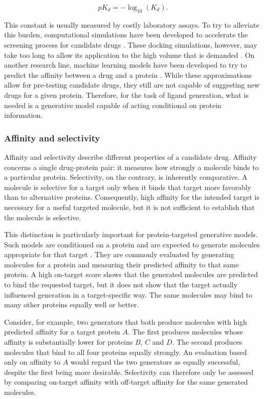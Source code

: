 \documentclass[a4paper,12pt]{article}
\begin{document}
\begin{equation*}
    pK_d = -\log_{10}(K_d).
\end{equation*}

This constant is usually measured by costly laboratory assays. To try to alleviate this burden, computational simulations have been developed to accelerate the screening process for candidate drugs \parencite{trott2010autodock}. These docking simulations, however, may take too long to allow its application to the high volume that is demanded \parencite{Paggi2024}. On another research line, machine learning models have been developed to try to predict the affinity between a drug and a protein \parencite{ozturk2018deepdta}. While these approximations allow for pre-testing candidate drugs, they still are not capable of suggesting new drugs for a given protein. Therefore, for the task of ligand generation, what is needed is a generative model capable of acting conditional on protein information.

\subsubsection{Affinity and selectivity}

Affinity and selectivity describe different properties of a candidate drug.
Affinity concerns a single drug-protein pair: it measures how strongly a molecule binds to a particular protein.
Selectivity, on the contrary, is inherently comparative. A molecule is selective for a target only when it binds that target more favorably than to alternative proteins. Consequently, high affinity for the intended target is necessary for a useful targeted molecule, but it is not sufficient to establish that the molecule is selective.

This distinction is particularly important for protein-targeted generative models. Such models are conditioned on a protein and are expected to generate molecules appropriate for that target \parencite{Shah_Zhu_Lu_Wang_Tang_Li_2025,Creanza_Alberga_Patruno_Mangiatordi_Ancona_2025,Chen_Wang_Li_Zeng_Zeng_Xu_2025}. They are commonly evaluated by generating molecules for a protein and measuring their predicted affinity to that same protein. A high on-target score shows that the generated molecules are predicted to bind the requested target, but it does not show that the target actually influenced generation in a target-specific way. The same molecules may bind to many other proteins equally well or better.

Consider, for example, two generators that both produce molecules with high predicted affinity for a target protein $A$. The first produces molecules whose affinity is substantially lower for proteins $B$, $C$ and $D$. The second produces molecules that bind to all four proteins equally strongly. An evaluation based only on affinity to $A$ would regard the two generators as equally successful, despite the first being more desirable. Selectivity can therefore only be assessed by comparing on-target affinity with off-target affinity for the same generated molecules.
\end{document}
